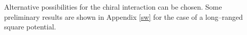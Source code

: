 Alternative possibilities for the chiral interaction can be chosen. Some preliminary results are shown in Appendix \ref{sw} for the case of a long--ranged square potential.



%


